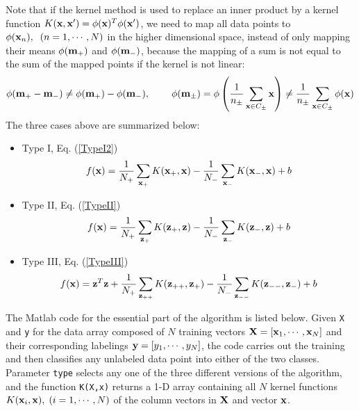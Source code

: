 \documentclass{article}
\begin{document}
Note that if the kernel method is used to replace an inner product by 
a kernel function $K({\bf x},{\bf x}')=\phi({\bf x})^T\phi({\bf x}')$,
we need to map all data points to $\phi({\bf x}_n),\;\;(n=1,\cdots,N)$
in the higher dimensional space, instead of only mapping their means 
$\phi({\bf m}_+)$ and $\phi({\bf m}_-)$, because the mapping of a sum 
is not equal to the sum of the mapped points if the kernel is not linear:
\begin{equation}
  \phi({\bf m}_+-{\bf m}_-)\ne \phi({\bf m}_+)-\phi({\bf m}_-), 
  \;\;\;\;\;\;\;\;
  \phi({\bf m}_\pm)=\phi\left(\frac{1}{n_\pm}\sum_{{\bf x}\in C_\pm}{\bf x}\right)
  \ne \frac{1}{n_\pm}\sum_{{\bf x}\in C_\pm} \phi({\bf x})
\end{equation}
The three cases above are summarized below:
\begin{itemize}
\item Type I, Eq. (\ref{TypeI2}) 
  \begin{equation}
  f({\bf x})=\frac{1}{N_+}\sum_{{\bf x}_+}K({\bf x}_+,{\bf x})
  -\frac{1}{N_-}\sum_{{\bf x}_-}K({\bf x}_-,{\bf x})+b
  \end{equation}
\item Type II,  Eq. (\ref{TypeII}) 
  \begin{equation}
    f({\bf x})=\frac{1}{N_+}\sum_{{\bf z}_+}K({\bf z}_+,{\bf z})
    -\frac{1}{N_-}\sum_{{\bf z}_-}K({\bf z}_-,{\bf z})+b
  \end{equation}
\item Type III, Eq. (\ref{TypeIII}) 
  \begin{equation}
  f({\bf x})={\bf z}^T{\bf z}
  +\frac{1}{N_+}\sum_{{\bf z}_{++}}K({\bf z}_{++},{\bf z}_+)
  -\frac{1}{N_-}\sum_{{\bf z}_{--}}K({\bf z}_{--},{\bf z}_-)+b
  \end{equation}
\end{itemize}

The Matlab code for the essential part of the algorithm is listed
below. Given \verb|X| and \verb|y| for the data array composed of $N$ 
training vectors ${\bf X}=[{\bf x}_1,\cdots,{\bf x}_N]$ and their 
corresponding labelings ${\bf y}=[y_1,\cdots,y_N]$, the code carries 
out the training and then classifies any unlabeled data point into 
either of the two classes. Parameter \verb|type| selects any one of 
the three different versions of the algorithm, and the function 
\verb|K(X,x)| returns a 1-D array containing all $N$ kernel functions
$K({\bf x}_i,{\bf x}),\;(i=1,\cdots,N)$ of the column vectors in 
${\bf X}$ and vector ${\bf x}$.
\end{document}
